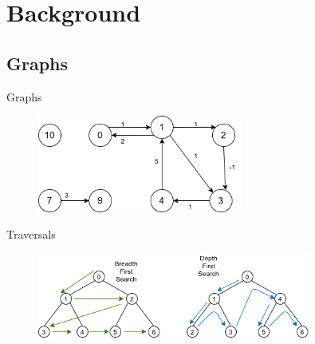 \documentclass[rgb]{beamer}
\begin{document}
        \section{Background}
            \subsection{Graphs}
                \begin{frame}{Graphs}
                    \begin{figure}
                     \begin{center}
                      \includegraphics[keepaspectratio, height=0.8\textheight, width=0.6\textwidth]{img/data_struct_gr.png}
                     \end{center}
                    \end{figure}
                \end{frame}
            
                \begin{frame}{Traversals}
                    \begin{figure}
                     \begin{center}
                      \includegraphics[keepaspectratio, height=0.8\textheight, width=0.8\textwidth]{img/bfs-dfs.png}
                     \end{center}
                    \end{figure}
                \end{frame}
                    
                
\end{document}
